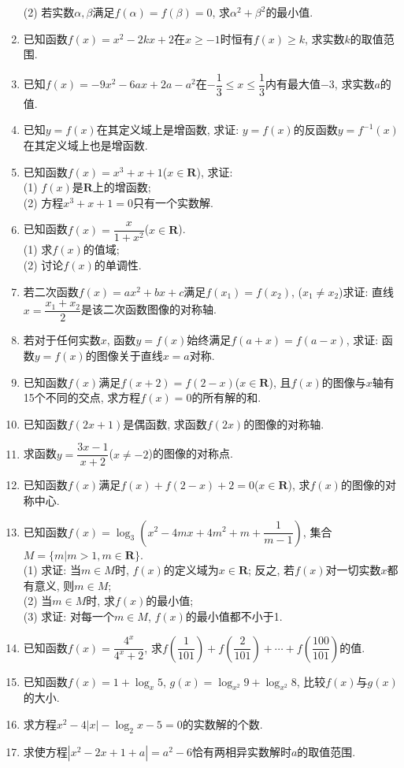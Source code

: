\documentclass[10pt,a4paper]{article}
\begin{document}
\begin{enumerate}[1.]
(2) 若实数$\alpha ,\beta$满足$f(\alpha)=f(\beta)=0$, 求$\alpha ^2+\beta ^2$的最小值.
\item 已知函数$f(x)=x^2-2kx+2$在$x\ge -1$时恒有$f(x)\ge k$, 求实数$k$的取值范围.
\item 已知$f(x)=-9x^2-6ax+2a-a^2$在$-\dfrac 13\le x\le \dfrac 13$内有最大值$-3$, 求实数$a$的值.
\item 已知$y=f(x)$在其定义域上是增函数, 求证: $y=f(x)$的反函数$y=f^{-1}(x)$在其定义域上也是增函数.
\item 已知函数$f(x)=x^3+x+1$($x\in \mathbf{R}$), 求证:\\
(1) $f(x)$是$\mathbf{R}$上的增函数;\\
(2) 方程$x^3+x+1=0$只有一个实数解.
\item 已知函数$f(x)=\dfrac x{1+x^2}$($x\in \mathbf{R}$).\\
(1) 求$f(x)$的值域;\\
(2) 讨论$f(x)$的单调性.
\item 若二次函数$f(x)=ax^2+bx+c$满足$f(x_1)=f(x_2)$, ($x_1\ne x_2$)求证: 直线$x=\dfrac{x_1+x_2}2$是该二次函数图像的对称轴.
\item 若对于任何实数$x$, 函数$y=f(x)$始终满足$f(a+x)=f(a-x)$, 求证: 函数$y=f(x)$的图像关于直线$x=a$对称.
\item 已知函数$f(x)$满足$f(x+2)=f(2-x)$($x\in \mathbf{R}$), 且$f(x)$的图像与$x$轴有15个不同的交点, 求方程$f(x)=0$的所有解的和.
\item 已知函数$f(2x+1)$是偶函数, 求函数$f(2x)$的图像的对称轴.
\item 求函数$y=\dfrac{3x-1}{x+2}$($x\ne -2$)的图像的对称点.
\item 已知函数$f(x)$满足$f(x)+f(2-x)+2=0$($x\in \mathbf{R}$), 求$f(x)$的图像的对称中心.
\item 已知函数$f(x)=\log_3(x^2-4mx+4m^2+m+\dfrac 1{m-1})$, 集合$M=\{m|m>1,m\in \mathbf{R}\}$.\\
(1) 求证: 当$m\in M$时, $f(x)$的定义域为$x\in \mathbf{R}$; 反之, 若$f(x)$对一切实数$x$都有意义, 则$m\in M$;\\
(2) 当$m\in M$时, 求$f(x)$的最小值;\\
(3) 求证: 对每一个$m\in M$, $f(x)$的最小值都不小于1.
\item 已知函数$f(x)=\dfrac{4^x}{4^x+2}$, 求$f(\dfrac 1{101})+f(\dfrac 2{101})+\cdots +f(\dfrac{100}{101})$的值.
\item 已知函数$f(x)=1+\log_x5$, $g(x)=\log_{x^2}9+\log_{x^2}8$, 比较$f(x)$与$g(x)$的大小.
\item 求方程$x^2-4|x|-\log_2x-5=0$的实数解的个数.
\item 求使方程$|x^2-2x+1+a|=a^2-6$恰有两相异实数解时$a$的取值范围.

\end{enumerate}
\end{document}

